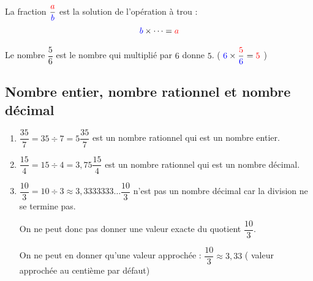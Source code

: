 \documentclass[a4paper,10pt]{report}
\begin{document}
\vspace{-3mm}
\noindent \begin{minipage}{8.5cm}
\begin{defn}
La fraction $\dfrac{\textcolor{red}{a}}{\textcolor{blue}{b}}$ est la solution de l'opération à trou : $$\textcolor{blue}{b} \times \dots = \textcolor{red}{a}$$
\end{defn}
\end{minipage}
\hspace{5mm}
\begin{minipage}{8cm}
\begin{ex}


\medskip
\noindent Le nombre $\dfrac{5}{6}$ est le nombre qui multiplié par $6$ donne $5$. ( $\textcolor{blue}{6} \times \dfrac{\textcolor{red}{5}}{\textcolor{blue}{6}} = \textcolor{red}{5}$ )
\end{ex}
\end{minipage}

\subsection{Nombre entier, nombre rationnel et nombre décimal}

\begin{ex}
\begin{enumerate}
\item[•] $\dfrac{35}{7} = 35 \div 7 = 5$\hspace{3.6cm}$\dfrac{35}{7}$ est un nombre rationnel qui est un nombre entier.
\item[•] $\dfrac{15}{4}= 15 \div 4 = 3,75$\hspace{3.2cm}$\dfrac{15}{4}$ est un nombre rationnel qui est un nombre décimal.
\item[•] $\dfrac{10}{3}= 10 \div 3 \approx 3,3333333 \dots$\hspace{2cm}$\dfrac{10}{3}$ n'est pas un nombre décimal car la division ne se termine pas.

\noindent On ne peut donc pas donner une valeur exacte du quotient $\dfrac{10}{3}$.

\noindent On ne peut en donner qu'une valeur approchée : $\dfrac{10}{3} \approx 3,33$ ( valeur approchée au centième par défaut)
\end{enumerate}
\end{ex}
\end{document}
